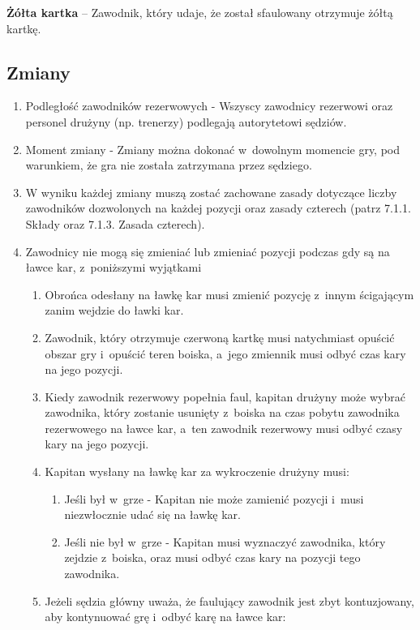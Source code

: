 \documentclass[12pt,a4paper]{article}
\renewcommand{\subsubsection}[1]{
  \oldsubsubsection{#1}%
  \leftskip1.5cm
}
\newcommand\yellowcard[1]{\bgroup\textcolor{darkyellow}{\textbf{#1}}}
\begin{document}
\yellowcard{Żółta kartka} -- Zawodnik, który udaje, że został sfaulowany
otrzymuje żółtą kartkę.

\subsection{Zmiany}

\subsubsection{Zasady zmian}

\begin{enumerate}
	\item
	      Podległość zawodników rezerwowych - Wszyscy zawodnicy
	      rezerwowi oraz personel drużyny (np. trenerzy) podlegają autorytetowi
	      sędziów.
	\item
	      Moment zmiany - Zmiany można dokonać w~dowolnym momencie gry,
	      pod warunkiem, że gra nie została zatrzymana przez sędziego.
	\item
	      W wyniku każdej zmiany muszą zostać zachowane zasady dotyczące liczby
	      zawodników dozwolonych na każdej pozycji oraz zasady czterech (patrz
	      7.1.1. Składy oraz 7.1.3. Zasada czterech).
	\item
	      Zawodnicy nie mogą się zmieniać lub zmieniać pozycji podczas gdy są na
	      ławce kar, z~poniższymi wyjątkami

	      \begin{enumerate}
		      \item
		            Obrońca odesłany na ławkę kar musi zmienić pozycję z~innym
		            ścigającym zanim wejdzie do ławki kar.
		      \item
		            Zawodnik, który otrzymuje czerwoną kartkę musi natychmiast opuścić
		            obszar gry i~opuścić teren boiska, a~jego zmiennik musi odbyć czas
		            kary na jego pozycji.
		      \item
		            Kiedy zawodnik rezerwowy popełnia faul, kapitan drużyny może wybrać
		            zawodnika, który zostanie usunięty z~boiska na czas pobytu zawodnika
		            rezerwowego na ławce kar, a~ten zawodnik rezerwowy musi odbyć czasy
		            kary na jego pozycji.
		      \item
		            Kapitan wysłany na ławkę kar za wykroczenie drużyny musi:

		            \begin{enumerate}
			            \item
			                  Jeśli był w~grze - Kapitan nie może zamienić pozycji i~musi
			                  niezwłocznie udać się na ławkę kar.
			            \item
			                  Jeśli nie był w~grze - Kapitan musi wyznaczyć zawodnika, który
			                  zejdzie z~boiska, oraz musi odbyć czas kary na pozycji tego
			                  zawodnika.
		            \end{enumerate}
		      \item
		            Jeżeli sędzia główny uważa, że faulujący zawodnik jest zbyt
		            kontuzjowany, aby kontynuować grę i~odbyć karę na ławce kar:


\end{enumerate}
\end{enumerate}
\end{document}
